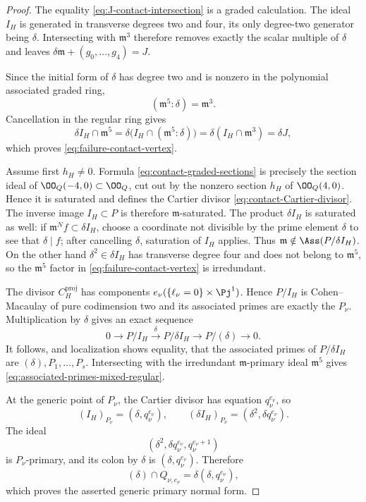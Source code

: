 \begin{proof}
The equality \eqref{eq:J-contact-intersection} is a graded
calculation.  The ideal \(I_H\) is generated in transverse degrees
two and four, its only degree-two generator being \(\delta\).
Intersecting with \(\mathfrak m^3\) therefore removes exactly the
scalar multiple of \(\delta\) and leaves
\(\delta\mathfrak m+(g_0,\ldots,g_4)=J\).

Since the initial form of \(\delta\) has degree two and is nonzero in
the polynomial associated graded ring,
\[
 (\mathfrak m^5:\delta)=\mathfrak m^3.
\]
Cancellation in the regular ring gives
\[
 \delta I_H\cap\mathfrak m^5
 =\delta\bigl(I_H\cap(\mathfrak m^5:\delta)\bigr)
 =\delta(I_H\cap\mathfrak m^3)
 =\delta J,
\]
which proves \eqref{eq:failure-contact-vertex}.

Assume first \(h_H\ne0\).  Formula
\eqref{eq:contact-graded-sections} is precisely the section ideal of
\(\OO_Q(-4,0)\subset\OO_Q\), cut out by the nonzero section \(h_H\)
of \(\OO_Q(4,0)\).  Hence it is saturated and defines the Cartier
divisor \eqref{eq:contact-Cartier-divisor}.  The inverse image
\(I_H\subset P\) is therefore \(\mathfrak m\)-saturated.  The product
\(\delta I_H\) is saturated as well: if
\(\mathfrak m^N f\subset\delta I_H\), choose a coordinate not
divisible by the prime element \(\delta\) to see that \(\delta\mid f\);
after cancelling \(\delta\), saturation of \(I_H\) applies.
Thus \(\mathfrak m\notin\Ass(P/\delta I_H)\).
On the other hand \(\delta^2\in\delta I_H\) has transverse degree
four and does not belong to \(\mathfrak m^5\), so the
\(\mathfrak m^5\) factor in
\eqref{eq:failure-contact-vertex} is irredundant.

The divisor \(C_H^{\mathrm{proj}}\) has components
\(e_\nu(\{\ell_\nu=0\}\times\Pj^1)\).  Hence
\(P/I_H\) is Cohen--Macaulay of pure codimension two and its associated
primes are exactly the \(P_\nu\).  Multiplication by \(\delta\) gives
an exact sequence
\[
 0\longrightarrow P/I_H
 \xrightarrow{\ \delta\ } P/\delta I_H
 \longrightarrow P/(\delta)\longrightarrow0.
\]
It follows, and localization shows equality, that the associated
primes of \(P/\delta I_H\) are
\((\delta),P_1,\ldots,P_s\).  Intersecting with the irredundant
\(\mathfrak m\)-primary ideal \(\mathfrak m^5\) gives
\eqref{eq:associated-primes-mixed-regular}.

At the generic point of \(P_\nu\), the Cartier divisor has equation
\(q_\nu^{e_\nu}\), so
\[
 (I_H)_{P_\nu}=(\delta,q_\nu^{e_\nu}),\qquad
 (\delta I_H)_{P_\nu}
 =(\delta^2,\delta q_\nu^{e_\nu}).
\]
The ideal
\[
 (\delta^2,\delta q_\nu^{e_\nu},q_\nu^{e_\nu+1})
\]
is \(P_\nu\)-primary, and its colon by \(\delta\) is
\((\delta,q_\nu^{e_\nu})\).  Therefore
\[
 (\delta)\cap Q_{\nu,e_\nu}
 =
 \delta(\delta,q_\nu^{e_\nu}),
\]
which proves the asserted generic primary normal form.


\end{proof}
